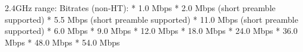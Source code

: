 2.4GHz range:
		Bitrates (non-HT):
			* 1.0 Mbps
			* 2.0 Mbps (short preamble supported)
			* 5.5 Mbps (short preamble supported)
			* 11.0 Mbps (short preamble supported)
			* 6.0 Mbps
			* 9.0 Mbps
			* 12.0 Mbps
			* 18.0 Mbps
			* 24.0 Mbps
			* 36.0 Mbps
			* 48.0 Mbps
			* 54.0 Mbps
